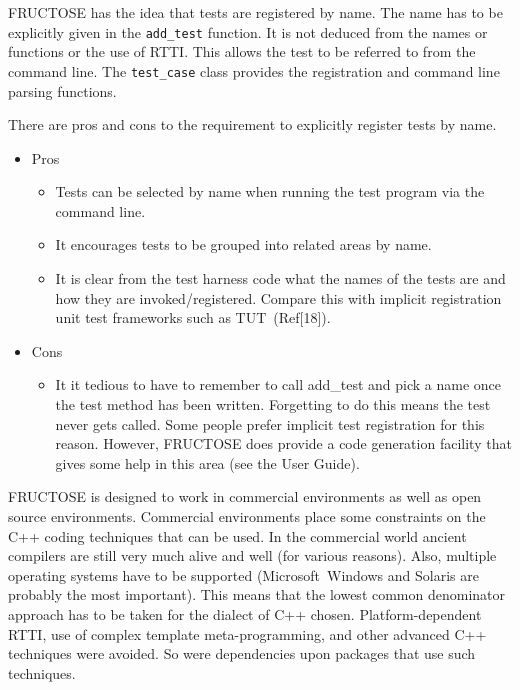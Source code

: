 \documentclass{book}
\begin{document}
FRUCTOSE has the idea that tests are registered by name.
The name has to be explicitly given in the {\tt add\_test} function.
It is not deduced from the names or functions or the use of RTTI.
This allows the test to be referred to from the command line.
The {\tt test\_case} class provides the registration and
command line parsing functions.

There are pros and cons to the requirement to explicitly register
tests by name. 
\begin{itemize}
\item Pros
\begin{itemize}
\item Tests can be selected by name when running the test program via
the command line.

\item It encourages tests to be grouped into related areas by name.

\item It is clear from the test harness code what the names of
the tests are and how they are invoked/registered. Compare this with
implicit registration unit test frameworks such as 
TUT~(Ref[18]).
\end{itemize}

\item Cons
\begin{itemize}
\item It it tedious to have to remember to call add\_test and pick a name
once the test method has been written. Forgetting to do this means the
test never gets called. Some people prefer implicit test registration
for this reason. However, FRUCTOSE does provide a code generation facility
that gives some help in this area (see the User Guide).
\end{itemize}

\end{itemize}


FRUCTOSE is designed to work in commercial environments as well as open source
environments. Commercial environments place some constraints on the C++ coding
techniques that can be used. In the commercial world ancient compilers are
still very much alive and well (for various reasons). Also, multiple operating
systems have to be supported (Microsoft~Windows and Solaris are probably the
most important). This means that the lowest common denominator approach has to
be taken for the dialect of C++ chosen. Platform-dependent RTTI, use of 
complex template meta-programming, and other advanced C++ techniques were
avoided. So were dependencies upon packages that use such techniques.
\end{document}
